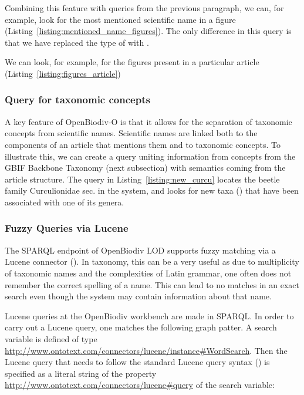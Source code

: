 Combining this feature with queries from the previous paragraph, we can, for example, look for the most mentioned scientific name in a figure (Listing~\ref{listing:mentioned_name_figures}). The only difference in this query is that we have replaced the type of  with . 



We can look, for example, for the figures present in a particular article (Listing~\ref{listing:figures_article})



\subsubsection{Query for taxonomic concepts}

A key feature of OpenBiodiv-O is that it allows for the separation of taxonomic concepts from scientific names. Scientific names are linked both to the components of an article that mentions them and to taxonomic concepts. To illustrate this, we can create a query uniting information from concepts from the GBIF Backbone Taxonomy (next subsection) with semantics coming from the article structure. The query in Listing~\ref{listing:new_curcu} locates the beetle family Curculionidae sec. \cite{gbif_secretariat_gbif_2017} in the system, and looks for new taxa () that have been associated with one of its genera.

\subsubsection{Fuzzy Queries via Lucene}

The SPARQL endpoint of OpenBiodiv LOD supports fuzzy matching via a Lucene connector (\cite{ontotext_graphdb_2018}). In taxonomy, this can be a very useful as due to multiplicity of taxonomic names and the complexities of Latin grammar, one often does not remember the correct spelling of a name. This can lead to no matches in an exact search even though the system may contain information about that name.

Lucene queries at the OpenBiodiv workbench are made in SPARQL. In order to carry out a Lucene query, one matches the following graph patter. A search variable is defined of type \url{http://www.ontotext.com/connectors/lucene/instance#WordSearch}. Then the Lucene query that needs to follow the standard Lucene query syntax (\cite{the_apache_software_foundation_apache_2013}) is specified as a literal string of the property \url{http://www.ontotext.com/connectors/lucene#query} of the search variable:

